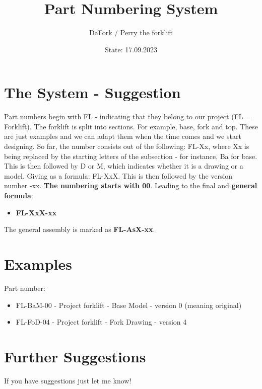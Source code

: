 \documentclass{article}
\title{Part Numbering System}
\author{DaFork / Perry the forklift}
\date{State: 17.09.2023}
\begin{document}
    \maketitle
    
    \section*{The System - Suggestion}
    Part numbers begin with FL - indicating that they belong to our project (FL = Forklift). 
    The forklift is split into sections. For example, base, fork and top. These are just
    examples and we can adapt them when the time comes and we start designing.
    So far, the number consists out of the following: FL-Xx, where Xx is being replaced by the starting
    letters of the subsection - for instance, Ba for base. This is then followed by D or M, which indicates
    whether it is a drawing or a model. Giving as a formula:
    FL-XxX. This is then followed by the version number -xx. \textbf{The numbering starts with 00}. Leading to the final 
    and \textbf{general formula}:

    \begin{itemize}
        \item \textbf{FL-XxX-xx}
    \end{itemize}

    The general assembly is marked as \textbf{FL-AsX-xx}.

    \section{Examples}
    Part number: 
    \begin{itemize}
        \item FL-BaM-00 - Project forklift - Base Model - version 0 (meaning original)
        \item FL-FoD-04 - Project forklift - Fork Drawing - version 4
    \end{itemize}

    \section*{Further Suggestions}
    If you have suggestions just let me know!    
\end{document}
